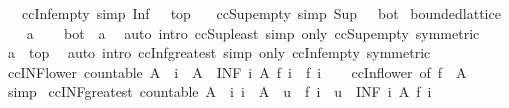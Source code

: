 \begin{isabellebody}
\ \ \ ccInf{\isacharunderscore}empty\ {\isacharbrackleft}simp{\isacharbrackright}{\isacharcolon}\ {\isachardoublequoteopen}Inf\ {\isacharbraceleft}{\isacharbraceright}\ {\isacharequal}\ top{\isachardoublequoteclose}\isanewline
\ \ \ ccSup{\isacharunderscore}empty\ {\isacharbrackleft}simp{\isacharbrackright}{\isacharcolon}\ {\isachardoublequoteopen}Sup\ {\isacharbraceleft}{\isacharbraceright}\ {\isacharequal}\ bot{\isachardoublequoteclose}\isanewline
{}\isanewline
\isanewline
{}\isamarkupfalse%
\ bounded{\isacharunderscore}lattice\isanewline
%
\isadelimproof
%
\endisadelimproof
%
\isatagproof
{}\isamarkupfalse%
\isanewline
\ \ \isamarkupfalse%
\ a\isanewline
\ \ \isamarkupfalse%
\ {\isachardoublequoteopen}bot\ {\isasymle}\ a{\isachardoublequoteclose}\ \isamarkupfalse%
\ {\isacharparenleft}auto\ intro{\isacharcolon}\ ccSup{\isacharunderscore}least\ simp\ only{\isacharcolon}\ ccSup{\isacharunderscore}empty\ {\isacharbrackleft}symmetric{\isacharbrackright}{\isacharparenright}\isanewline
\ \ \isamarkupfalse%
\ {\isachardoublequoteopen}a\ {\isasymle}\ top{\isachardoublequoteclose}\ \isamarkupfalse%
\ {\isacharparenleft}auto\ intro{\isacharcolon}\ ccInf{\isacharunderscore}greatest\ simp\ only{\isacharcolon}\ ccInf{\isacharunderscore}empty\ {\isacharbrackleft}symmetric{\isacharbrackright}{\isacharparenright}\isanewline
{}\isamarkupfalse%
%
\endisatagproof
{\isafoldproof}%
%
\isadelimproof
\isanewline
%
\endisadelimproof
\isanewline
{}\isamarkupfalse%
\ ccINF{\isacharunderscore}lower{\isacharcolon}\ {\isachardoublequoteopen}countable\ A\ {\isasymLongrightarrow}\ i\ {\isasymin}\ A\ {\isasymLongrightarrow}\ {\isacharparenleft}INF\ i\ {\isacharcolon}A{\isachardot}\ f\ i{\isacharparenright}\ {\isasymle}\ f\ i{\isachardoublequoteclose}\isanewline
%
\isadelimproof
\ \ %
\endisadelimproof
%
\isatagproof
{}\isamarkupfalse%
\ ccInf{\isacharunderscore}lower\ {\isacharbrackleft}of\ {\isachardoublequoteopen}f\ {\isacharbackquote}\ A{\isachardoublequoteclose}{\isacharbrackright}\ \isamarkupfalse%
\ simp%
\endisatagproof
{\isafoldproof}%
%
\isadelimproof
\isanewline
%
\endisadelimproof
\isanewline
{}\isamarkupfalse%
\ ccINF{\isacharunderscore}greatest{\isacharcolon}\ {\isachardoublequoteopen}countable\ A\ {\isasymLongrightarrow}\ {\isacharparenleft}{\isasymAnd}i{\isachardot}\ i\ {\isasymin}\ A\ {\isasymLongrightarrow}\ u\ {\isasymle}\ f\ i{\isacharparenright}\ {\isasymLongrightarrow}\ u\ {\isasymle}\ {\isacharparenleft}INF\ i\ {\isacharcolon}A{\isachardot}\ f\ i{\isacharparenright}{\isachardoublequoteclose}\isanewline

\end{isabellebody}
